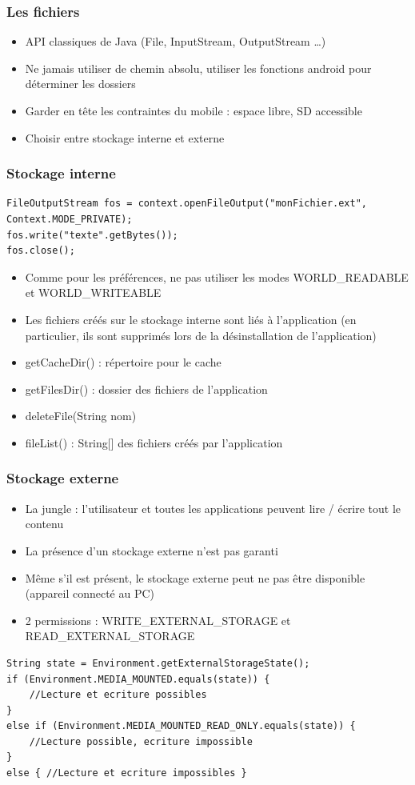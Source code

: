 \documentclass{beamer}
\begin{document}
\begin{frame}[fragile]
\frametitle{Les fichiers}
\begin{itemize}
    \item API classiques de Java (File, InputStream, OutputStream \ldots)
    \item Ne jamais utiliser de chemin absolu, utiliser les fonctions android pour déterminer les dossiers
    \item Garder en tête les contraintes du mobile : espace libre, SD accessible
    \item Choisir entre stockage interne et externe
\end{itemize}
\end{frame}
\begin{frame}[fragile]
\frametitle{Stockage interne}
\begin{lstlisting}
FileOutputStream fos = context.openFileOutput("monFichier.ext", Context.MODE_PRIVATE);
fos.write("texte".getBytes());
fos.close();
\end{lstlisting}
\begin{itemize}
    \item Comme pour les préférences, ne pas utiliser les modes WORLD\_READABLE et WORLD\_WRITEABLE
    \item Les fichiers créés sur le stockage interne sont liés à l'application
    (en particulier, ils sont supprimés lors de la désinstallation de l'application)
\end{itemize}
\begin{itemize}
    \item getCacheDir() : répertoire pour le cache
    \item getFilesDir() : dossier des fichiers de l'application
    \item deleteFile(String nom)
    \item fileList() : String[] des fichiers créés par l'application
\end{itemize}
\end{frame}
\begin{frame}[fragile]
\frametitle{Stockage externe}
\begin{itemize}
    \item La jungle : l'utilisateur et toutes les applications peuvent lire / écrire tout le contenu
    \item La présence d'un stockage externe n'est pas garanti
    \item Même s'il est présent, le stockage externe peut ne pas être
    disponible (appareil connecté au PC)
    \item 2 permissions : WRITE\_EXTERNAL\_STORAGE et READ\_EXTERNAL\_STORAGE
\end{itemize}
\begin{lstlisting}
String state = Environment.getExternalStorageState();
if (Environment.MEDIA_MOUNTED.equals(state)) {
    //Lecture et ecriture possibles
} 
else if (Environment.MEDIA_MOUNTED_READ_ONLY.equals(state)) {
    //Lecture possible, ecriture impossible
} 
else { //Lecture et ecriture impossibles }
\end{lstlisting}
\end{frame}
\end{document}
